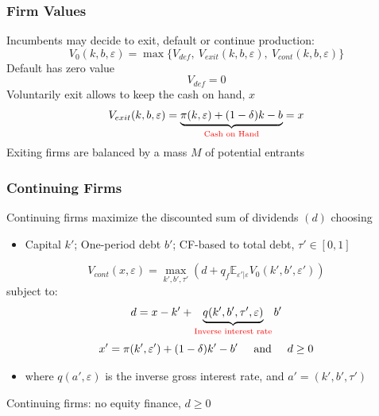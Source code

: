 \documentclass[aspectratio=169,xcolor=table]{beamer}
\providecommand{\E}{\mathbb{E}}
\begin{document}
\begin{frame}[label=Firmvalues] \frametitle{Firm Values}

Incumbents may decide to exit, default or continue production: 
\begin{equation*} \label{eq:default decision}
    V_0(k,b,\varepsilon) = \max \{V_{def}, \  V_{exit}(k,b,\varepsilon),  \ V_{cont}(k,b,\varepsilon) \}
\end{equation*}
Default has zero value
$$ V_{def} = 0 $$ 
Voluntarily exit allows to keep the cash on hand, $x$ 
 $$    V_{exit}(k, b, \varepsilon) =  \underbrace{\pi(k,\varepsilon) + (1-\delta)k - b}_{\textcolor{red}{\text{Cash on Hand}}}  = x $$
Exiting firms are balanced by a mass $M$ of potential entrants \hfill \hyperlink{Entrants}{}
\end{frame}

\begin{frame}[label= ContFirms] \frametitle{Continuing Firms \hfill\hyperlink{Model Summary}{}}

Continuing firms maximize the discounted sum of dividends $(d)$ choosing
\begin{itemize} \small
    \item Capital $k'$; One-period debt $b'$; CF-based to total debt, $\tau' \in [0,1]$
\end{itemize} \normalsize


\begin{equation*} \label{eq:V_cont}
    V_{cont}(x,\varepsilon) = \max_{k',b', \tau'} \left( d + q_f \E_{\varepsilon'|\varepsilon} V_0(k',b', \varepsilon') \right)
\end{equation*}
subject to: 
$$ d = x - k' +  \underbrace{q(k',b',\tau', \varepsilon)}_{\textcolor{red}{\text{Inverse interest rate}}} b' $$
\begin{equation*} \label{eq:budget}
x' = \pi(k',\varepsilon')+(1-\delta)k'-b' \hspace{5mm} \text{and} \hspace{5mm} d \geq 0
\end{equation*} 

\begin{itemize} \small
    \item where $q(a',\varepsilon) $ is the inverse gross interest rate, and $a' = (k',b',\tau')$
\end{itemize} \normalsize
Continuing firms: no equity finance, $d \geq 0$ 
  
\end{frame}
\end{document}
